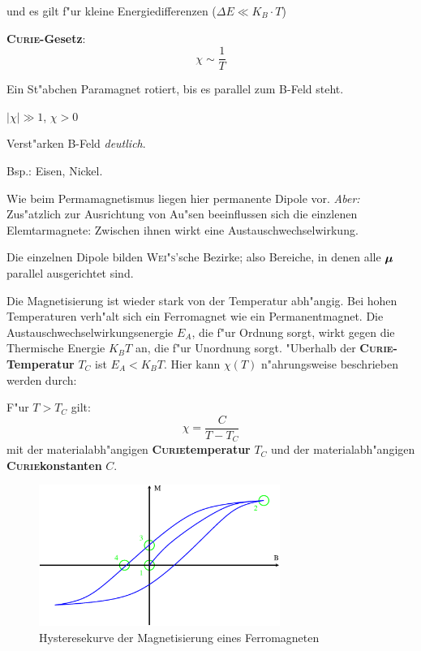 \begin{description}[\setlabelstyle{\bfseries\slshape}]
und es gilt f"ur kleine Energiedifferenzen ($\Delta E \ll K_B \cdot T$)
\begin{Wichtig}
   \textbf{\textsc{Curie}-Gesetz}:
   \begin{equation}
      \label{eq:383}
      \chi \sim \frac{1}{T}
   \end{equation}
\end{Wichtig}

Ein St"abchen Paramagnet rotiert, bis es parallel zum B-Feld steht.

\item[Ferromagnete]  $|\chi| \gg 1$, $\chi > 0$

Verst"arken B-Feld \emph{deutlich}.

Bsp.: Eisen, Nickel.

\bigskip

Wie beim Permamagnetismus liegen hier permanente Dipole
vor. \emph{Aber:} Zus"atzlich zur Ausrichtung von Au"sen beeinflussen
sich die einzlenen Elemtarmagnete: Zwischen ihnen wirkt eine
Austauschwechselwirkung.

Die einzelnen Dipole bilden \textsc{Wei"s}'sche
Bezirke; also Bereiche, in denen alle $\boldsymbol{\mu}$ parallel ausgerichtet
sind.

Die Magnetisierung ist wieder stark von der Temperatur abh"angig. Bei
hohen Temperaturen verh"alt sich ein Ferromagnet wie ein
Permanentmagnet. Die Austauschwechselwirkungsenergie $E_A$, die f"ur
Ordnung sorgt, wirkt gegen
die Thermische Energie $K_B T$ an, die f"ur Unordnung sorgt. "Uberhalb
der \textbf{\textsc{Curie}-Temperatur} $T_C$
ist $E_A < K_BT$. Hier kann $\chi(T)$ n"ahrungsweise beschrieben werden
durch:
\begin{Wichtig}
    F"ur $T > T_C$ gilt:
   \begin{equation}
      \label{eq:384}
      \chi = \frac{C}{T - T_C}
   \end{equation}
mit der materialabh"angigen \textbf{\textsc{Curie}temperatur} $T_C$ und
der materialabh"angigen \textbf{\textsc{Curie}konstanten} $C$.
\end{Wichtig}


\begin{figure}[h]
   \centering
   \includegraphics[width=0.7\textwidth]{bilder/hysterese_ferro}
   \caption{Hysteresekurve der Magnetisierung eines Ferromagneten}
\label{abb_hysterese_ferro}
\end{figure}


\end{description}
